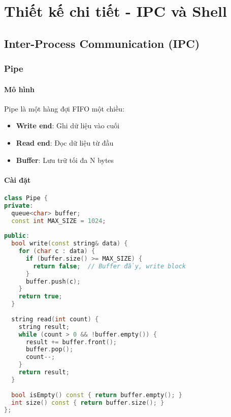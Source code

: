 
\chapter{Thiết kế chi tiết - IPC và Shell}
\label{ch:ipc_shell}

\section{Inter-Process Communication (IPC)}

\subsection{Pipe}

\subsubsection{Mô hình}

Pipe là một hàng đợi FIFO một chiều:
\begin{itemize}[leftmargin=1.5cm]
  \item \textbf{Write end}: Ghi dữ liệu vào cuối
  \item \textbf{Read end}: Đọc dữ liệu từ đầu
  \item \textbf{Buffer}: Lưu trữ tối đa N bytes
\end{itemize}

\subsubsection{Cài đặt}

\begin{lstlisting}[language=C++,caption={Pipe implementation}]
class Pipe {
private:
  queue<char> buffer;
  const int MAX_SIZE = 1024;
  
public:
  bool write(const string& data) {
    for (char c : data) {
      if (buffer.size() >= MAX_SIZE) {
        return false;  // Buffer đầy, write block
      }
      buffer.push(c);
    }
    return true;
  }
  
  string read(int count) {
    string result;
    while (count > 0 && !buffer.empty()) {
      result += buffer.front();
      buffer.pop();
      count--;
    }
    return result;
  }
  
  bool isEmpty() const { return buffer.empty(); }
  int size() const { return buffer.size(); }
};
\end{lstlisting}

